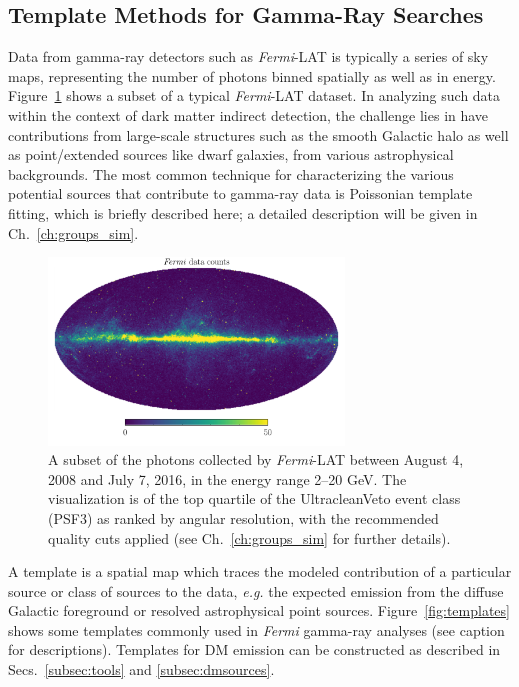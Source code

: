 \subsection{Template Methods for Gamma-Ray Searches}
\label{subsec:statmethods}

Data from gamma-ray detectors such as \emph{Fermi}-LAT is typically a series of sky maps, representing the number of photons binned spatially as well as in energy. Figure~\ref{fig:data} shows a subset of a typical \emph{Fermi}-LAT dataset. In analyzing such data within the context of dark matter indirect detection, the challenge lies in have contributions from large-scale structures such as the smooth Galactic halo as well as point/extended sources like dwarf galaxies, from various astrophysical backgrounds. The most common technique for characterizing the various potential sources that contribute to gamma-ray data is Poissonian template fitting, which is briefly described here; a detailed description will be given in Ch.~\ref{ch:groups_sim}. 

\begin{figure}[htbp] 
\centering
 \includegraphics[width=0.7\textwidth]{ch-intro/data.pdf}
\caption{A subset of the photons collected by \emph{Fermi}-LAT between August 4, 2008 and July 7, 2016, in the energy range 2--20 GeV. The visualization is of the top quartile of the UltracleanVeto event class (PSF3) as ranked by angular resolution, with the recommended quality cuts applied (see Ch.~\ref{ch:groups_sim} for further details).}  
\label{fig:data}
\end{figure}

A template is a spatial map which traces the modeled contribution of a particular source or class of sources to the data, \emph{e.g.} the expected emission from the diffuse Galactic foreground or resolved astrophysical point sources. Figure~\ref{fig:templates} shows some templates commonly used in \emph{Fermi} gamma-ray analyses (see caption for descriptions). Templates for DM emission can be constructed as described in Secs.~\ref{subsec:tools} and \ref{subsec:dmsources}. 

